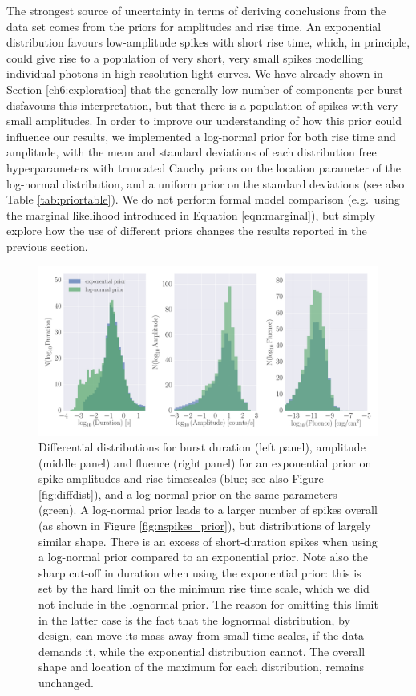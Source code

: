 \documentclass[12pt]{emulateapj}
\begin{document}
The strongest source of uncertainty in terms of deriving conclusions from the data set comes from the priors for
amplitudes and rise time. An exponential distribution favours low-amplitude spikes with short rise time, which, in principle,
could give rise to a population of very short, very small spikes modelling individual photons in high-resolution light curves. We have already shown in 
Section \ref{ch6:exploration} that the generally low number of components per burst disfavours this interpretation, but that there is a population of spikes
 with very small amplitudes. In order
to improve our understanding of how this prior could influence our results, we implemented a log-normal prior for both rise time
and amplitude, with the mean and standard deviations of each distribution free hyperparameters with truncated Cauchy priors on the location parameter of
the log-normal distribution, and a uniform prior on the standard deviations (see also Table \ref{tab:priortable}). We do not perform formal model comparison
(e.g.\ using the marginal likelihood introduced in Equation \ref{eqn:marginal}), but simply explore how the use of different priors
changes the results reported in the previous section.

\begin{figure}[htbp]
\begin{center}
\includegraphics[width=\textwidth]{f10.pdf}%
\caption{Differential distributions for burst duration (left panel), amplitude (middle panel) and fluence (right panel) for an exponential prior on spike 
amplitudes and rise timescales (blue; see also Figure \ref{fig:diffdist}),
and a log-normal prior on the same parameters (green). A log-normal prior leads to a larger number of spikes overall (as shown in Figure \ref{fig:nspikes_prior}), but distributions of largely
similar shape. There is an excess of short-duration spikes when using a log-normal prior compared to an exponential prior. Note also the 
sharp cut-off in duration when using the exponential prior: this is set by the hard limit on the minimum rise time scale, which we did not include in the lognormal prior. 
The reason for omitting this limit in the latter case is the fact that the lognormal distribution, by design, can move its mass away from small time scales, if the data 
demands it, while the exponential distribution cannot. The overall shape and location of the maximum for each distribution, remains unchanged.}
\label{fig:diff_prior}
\end{center}
\end{figure}
\end{document}
